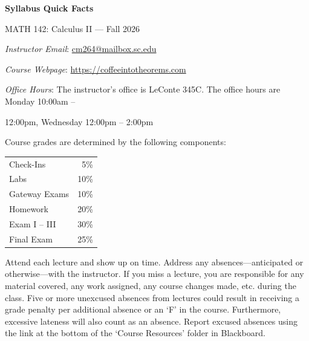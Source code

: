 \documentclass[11pt,letterpaper]{article}
\begin{document}
\begin{center} 
\bfseries
\color{scred}
\LARGE Syllabus Quick Facts \par\vspace{0.2\baselineskip}
\Large MATH 142: Calculus II --- Fall 2026
\end{center} \pspace


\hspace{0.53cm} {\itshape Instructor Email}: \href{mailto:cm264@mailbox.sc.edu}{cm264@mailbox.sc.edu} \par
\hspace{0.53cm} {\itshape Course Webpage}: \href{https://coffeeintotheorems.com}{https://coffeeintotheorems.com} \par
\hspace{0.53cm} {\itshape Office Hours}: The instructor's office is LeConte 345C. The office hours are Monday 10:00am -- \par \hspace{0.5cm} 12:00pm, Wednesday 12:00pm -- 2:00pm \pspace


Course grades are determined by the following components: \par \vspace{-0.3cm}
	\begin{table}[!ht]
        \begin{tabular}{lr}
	Check-Ins & 5\% \\
	Labs & 10\% \\
	Gateway Exams& 10\% \\
	Homework & 20\% \\
	Exam I -- III & 30\% \\
	Final Exam & 25\%
        \end{tabular} 
        \end{table}


Attend each lecture and show up on time. Address any absences---anticipated or otherwise---with the instructor. If you miss a lecture, you are responsible for any material covered, any work assigned, any course changes made, etc. during the class. Five or more unexcused absences from lectures could result in receiving a grade penalty per additional absence or an `F' in the course. Furthermore, excessive lateness will also count as an absence. Report excused absences using the link at the bottom of the `Course Resources' folder in Blackboard.
\pspace
\end{document}
